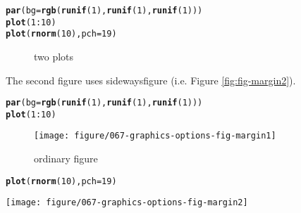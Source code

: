 \documentclass{article}\usepackage{graphicx, color}
\makeatletter
\newcommand{\hlfunctioncall}[1]{\textcolor[rgb]{0.501960784313725,0,0.329411764705882}{\textbf{#1}}}%
\newenvironment{kframe}{%
 \def\at@end@of@kframe{}%
 \ifinner\ifhmode%
  \def\at@end@of@kframe{\end{minipage}}%
  \begin{minipage}{\columnwidth}%
 \fi\fi%
 \def\FrameCommand##1{\hskip\@totalleftmargin \hskip-\fboxsep
 \colorbox{shadecolor}{##1}\hskip-\fboxsep
     \hskip-\linewidth \hskip-\@totalleftmargin \hskip\columnwidth}%
 \MakeFramed {\advance\hsize-\width
   \@totalleftmargin\z@ \linewidth\hsize
   \@setminipage}}%
 {\par\unskip\endMakeFramed%
 \at@end@of@kframe}
\newenvironment{knitrout}{}{} %
\makeatother
\begin{document}
\begin{knitrout}
\color{fgcolor}\begin{kframe}
\begin{alltt}
\hlfunctioncall{par}(bg = \hlfunctioncall{rgb}(\hlfunctioncall{runif}(1), \hlfunctioncall{runif}(1), \hlfunctioncall{runif}(1)))
\hlfunctioncall{plot}(1:10)
\hlfunctioncall{plot}(\hlfunctioncall{rnorm}(10), pch = 19)
\end{alltt}
\end{kframe}\begin{figure}[H]
\caption[two plots]{two plots\label{fig:fig-sub}}
\end{figure}


\end{knitrout}


The second figure uses sidewaysfigure (i.e. Figure \ref{fig:fig-margin2}).

\begin{knitrout}
\color{fgcolor}\begin{kframe}
\begin{alltt}
\hlfunctioncall{par}(bg = \hlfunctioncall{rgb}(\hlfunctioncall{runif}(1), \hlfunctioncall{runif}(1), \hlfunctioncall{runif}(1)))
\hlfunctioncall{plot}(1:10)
\end{alltt}
\end{kframe}\begin{figure}[H]

\texttt{[image: figure/067-graphics-options-fig-margin1]} \caption[ordinary figure]{ordinary figure\label{fig:fig-margin1}}
\end{figure}

\begin{kframe}\begin{alltt}
\hlfunctioncall{plot}(\hlfunctioncall{rnorm}(10), pch = 19)
\end{alltt}
\end{kframe}\begin{sidewaysfigure}[H]

\texttt{[image: figure/067-graphics-options-fig-margin2]} \caption[sideways figure]{sideways figure\label{fig:fig-margin2}}
\end{sidewaysfigure}


\end{knitrout}
\end{document}
